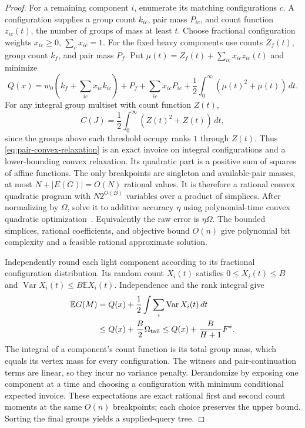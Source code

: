 \begin{proof}
For a remaining component $i$, enumerate its matching configurations
$c$. A configuration supplies a group count $k_{ic}$, pair mass
$P_{ic}$, and count function $z_{ic}(t)$, the number of groups of
mass at least $t$. Choose fractional configuration weights
$x_{ic}\ge0$, $\sum_c x_{ic}=1$. For the fixed heavy components use
counts $Z_f(t)$, group count $k_f$, and pair mass $P_f$. Put
$\mu(t)=Z_f(t)+\sum_{ic}x_{ic}z_{ic}(t)$ and minimize
\begin{equation}\label{eq:pair-convex-relaxation}
 Q(x)=w_0\left(k_f+\sum_{ic}x_{ic}k_{ic}\right)
       +P_f+\sum_{ic}x_{ic}P_{ic}
       +\frac12\int_0^\infty(\mu(t)^2+\mu(t))\,dt.
\end{equation}
For any integral group multiset with count function $Z(t)$,
\[
 C(J)=\frac12\int_0^\infty(Z(t)^2+Z(t))\,dt,
\]
since the groups above each threshold occupy ranks $1$ through
$Z(t)$. Thus \eqref{eq:pair-convex-relaxation} is an exact invoice
on integral configurations and a lower-bounding convex relaxation.
Its quadratic part is a positive sum of squares of affine functions.
The only breakpoints are singleton and available-pair masses, at
most $N+|E(G)|=O(N)$ rational values. It is therefore a rational
convex quadratic program with $N2^{O(B)}$ variables over a product
of simplices. After normalizing by $\Omega$, solve it to additive
accuracy $\eta$ using polynomial-time convex quadratic
optimization~\cite{nestnem1994}. Equivalently the raw error is
$\eta\Omega$. The bounded simplices, rational coefficients, and
objective bound $O(n)$ give polynomial bit complexity and a feasible
rational approximate solution.

Independently round each light component according to its fractional
configuration distribution. Its random count $X_i(t)$ satisfies
$0\le X_i(t)\le B$ and
$\operatorname{Var}X_i(t)\le B\mathbb E X_i(t)$. Independence and
the rank integral give
\begin{align*}
 \mathbb E G(M)&=Q(x)+\frac12\int\sum_i\operatorname{Var}X_i(t)\,dt\\
 &\le Q(x)+\frac B2\Omega_{\rm tail}
 \le Q(x)+\frac{B}{H+1}F^*.
\end{align*}
The integral of a component's count function is its total group
mass, which equals its vertex mass for every configuration.
The witness and pair-continuation terms are linear, so they incur
no variance penalty. Derandomize by exposing one component at a
time and choosing a configuration with minimum conditional expected
invoice. These expectations are exact rational first and second
count moments at the same $O(n)$ breakpoints; each choice preserves
the upper bound. Sorting the final groups yields a supplied-query
tree.


\end{proof}
